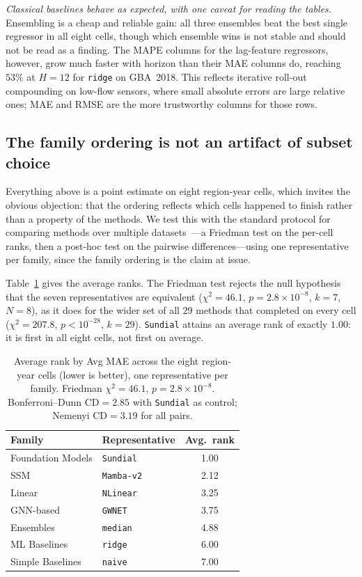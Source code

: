 \textit{Classical baselines behave as expected, with one caveat for reading the
tables.} Ensembling is a cheap and reliable gain: all three ensembles beat the
best single regressor in all eight cells, though which ensemble wins is not
stable and should not be read as a finding. The MAPE columns for the lag-feature
regressors, however, grow much faster with horizon than their MAE columns do,
reaching $53\%$ at $H{=}12$ for \texttt{ridge} on GBA~2018. This reflects
iterative roll-out compounding on low-flow sensors, where small absolute errors
are large relative ones; MAE and RMSE are the more trustworthy columns for those
rows.

\subsection{The family ordering is not an artifact of subset choice}
\label{app:extended:stats}

Everything above is a point estimate on eight region-year cells, which invites
the obvious objection: that the ordering reflects which cells happened to finish
rather than a property of the methods. We test this with the standard protocol
for comparing methods over multiple datasets~\citep{demsar2006}---a Friedman test
on the per-cell ranks, then a post-hoc test on the pairwise differences---using
one representative per family, since the family ordering is the claim at issue.

Table~\ref{tab:app_ranks} gives the average ranks. The Friedman test rejects the
null hypothesis that the seven representatives are equivalent
($\chi^2 = 46.1$, $p = 2.8\times10^{-8}$, $k=7$, $N=8$), as it does for the
wider set of all 29 methods that completed on every cell
($\chi^2 = 207.8$, $p < 10^{-28}$, $k=29$). \texttt{Sundial} attains an average
rank of exactly $1.00$: it is first in all eight cells, not first on average.

\begin{table}[t]
\centering
\caption{Average rank by Avg MAE across the eight region-year cells (lower is
better), one representative per family. Friedman $\chi^2 = 46.1$,
$p = 2.8\times10^{-8}$. Bonferroni--Dunn CD${}=2.85$ with \texttt{Sundial} as
control; Nemenyi CD${}=3.19$ for all pairs.}
\label{tab:app_ranks}
\begin{tabular}{l|l|c}
\toprule
Family & Representative & Avg.\ rank \\
\midrule
Foundation Models & \texttt{Sundial}   & 1.00 \\
SSM               & \texttt{Mamba-v2}  & 2.12 \\
Linear            & \texttt{NLinear}   & 3.25 \\
GNN-based         & \texttt{GWNET}     & 3.75 \\
Ensembles         & \texttt{median}    & 4.88 \\
ML Baselines      & \texttt{ridge}     & 6.00 \\
Simple Baselines  & \texttt{naive}     & 7.00 \\
\bottomrule
\end{tabular}
\end{table}

